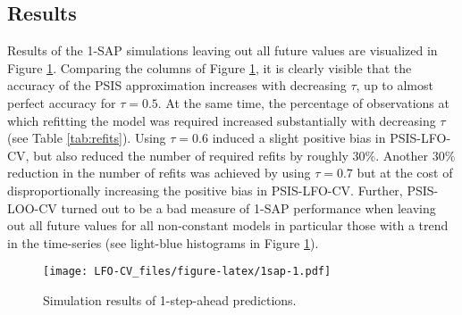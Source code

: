 \documentclass[american,]{article}
\begin{document}
\hypertarget{sim_results}{%
\subsection{Results}\label{sim_results}}

Results of the 1-SAP simulations leaving out all future values are visualized
in Figure \ref{fig:1sap}. Comparing the columns of Figure \ref{fig:1sap}, it
is clearly visible that the accuracy of the PSIS approximation increases with
decreasing \(\tau\), up to almost perfect accuracy for \(\tau = 0.5\). At the same
time, the percentage of observations at which refitting the model was required
increased substantially with decreasing \(\tau\) (see Table
\ref{tab:refits}). Using \(\tau = 0.6\) induced a slight positive
bias in PSIS-LFO-CV, but also reduced the number of required refits by roughly
\(30\%\). Another \(30\%\) reduction in the number of refits was achieved by
using \(\tau = 0.7\) but at the cost of disproportionally increasing the
positive bias in PSIS-LFO-CV. Further, PSIS-LOO-CV turned out to be a bad
measure of 1-SAP performance when leaving out all future values for all
non-constant models in particular those with a trend in the time-series (see
light-blue histograms in Figure \ref{fig:1sap}).

\begin{figure}
\centering
\texttt{[image: LFO-CV\_files/figure-latex/1sap-1.pdf]}
\caption{\label{fig:1sap}Simulation results of 1-step-ahead predictions.}
\end{figure}
\end{document}

